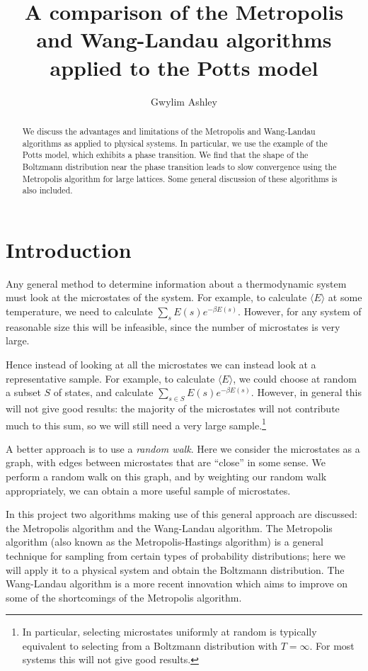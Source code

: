 \documentclass{article}
\author{Gwylim Ashley}
\title{A comparison of the Metropolis and Wang-Landau algorithms applied to the Potts model}
\begin{document}
\maketitle
\begin{abstract}
We discuss the advantages and limitations of the Metropolis and Wang-Landau algorithms as applied to physical systems.
In particular, we use the example of the Potts model, which exhibits a phase transition.
We find that the shape of the Boltzmann distribution near the phase transition leads to slow convergence using the Metropolis algorithm for large lattices.
Some general discussion of these algorithms is also included.
\end{abstract}
\tableofcontents
\section{Introduction}
Any general method to determine information about a thermodynamic system must look at the microstates of the system.
For example, to calculate $\langle E\rangle$ at some temperature, we need to calculate $\sum_s E(s)e^{-\beta E(s)}$.
However, for any system of reasonable size this will be infeasible, since the number of microstates is very large.

Hence instead of looking at all the microstates we can instead look at a representative sample.
For example, to calculate $\langle E\rangle$, we could choose at random a subset $S$ of states, and calculate $\sum_{s\in S}E(s)e^{-\beta E(s)}$.
However, in general this will not give good results: the majority of the microstates will not contribute much to this sum, so we will still need a very large sample.\footnote{In particular, selecting microstates uniformly at random is typically equivalent to selecting from a Boltzmann distribution with $T = \infty$. For most systems this will not give good results.}

A better approach is to use a \emph{random walk}.
Here we consider the microstates as a graph, with edges between microstates that are ``close'' in some sense.
We perform a random walk on this graph, and by weighting our random walk appropriately, we can obtain a more useful sample of microstates.

In this project two algorithms making use of this general approach are discussed: the Metropolis algorithm and the Wang-Landau algorithm.
The Metropolis algorithm (also known as the Metropolis-Hastings algorithm) is a general technique for sampling from certain types of probability distributions; here we will apply it to a physical system and obtain the Boltzmann distribution.
The Wang-Landau algorithm is a more recent innovation which aims to improve on some of the shortcomings of the Metropolis algorithm.
\end{document}
